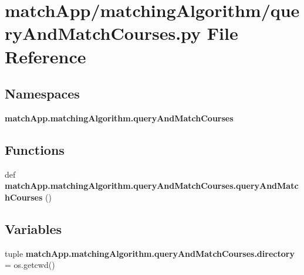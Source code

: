 \section{match\+App/matching\+Algorithm/query\+And\+Match\+Courses.py File Reference}
\label{query_and_match_courses_8py}
\subsection*{Namespaces}
\begin{DoxyCompactItemize}
\item 
 {\bf match\+App.\+matching\+Algorithm.\+query\+And\+Match\+Courses}
\end{DoxyCompactItemize}
\subsection*{Functions}
\begin{DoxyCompactItemize}
\item 
def {\bf match\+App.\+matching\+Algorithm.\+query\+And\+Match\+Courses.\+query\+And\+Match\+Courses} ()
\end{DoxyCompactItemize}
\subsection*{Variables}
\begin{DoxyCompactItemize}
\item 
tuple {\bf match\+App.\+matching\+Algorithm.\+query\+And\+Match\+Courses.\+directory} = os.\+getcwd()
\end{DoxyCompactItemize}
